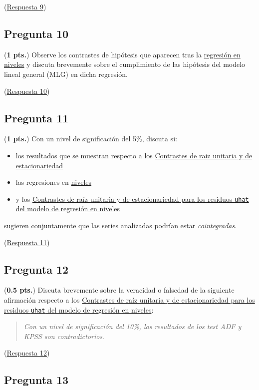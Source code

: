 \documentclass[10pt]{article}
\begin{document}
(\hyperref[sec:org66ff6be]{Respuesta 9})
\subsection*{Pregunta 10}
\label{sec:orge41fde9}

(\textbf{1 pts.}) Observe los contrastes de hipótesis que aparecen tras la \hyperref[sec:org1a45e1f]{regresión en niveles} y discuta brevemente sobre el cumplimiento de las hipótesis del modelo lineal general (MLG) en dicha regresión.

(\hyperref[sec:org0e46c64]{Respuesta 10})
\subsection*{Pregunta 11}
\label{sec:orgc7a6e69}

(\textbf{1 pts.}) Con un nivel de significación del 5\%, discuta si:
\begin{itemize}
\item los resultados que se muestran respecto a los \hyperref[sec:org3ac1b04]{Contrastes de raiz unitaria y de estacionariedad}
\item las regresiones en  \hyperref[sec:org1a45e1f]{niveles}
\item y los \hyperref[sec:org2512beb]{Contrastes de raíz unitaria y de estacionariedad para los residuos \texttt{uhat} del modelo de regresión en niveles}
\end{itemize}
sugieren conjuntamente que las series analizadas podrían estar \emph{cointegradas}.

(\hyperref[sec:org31c0c21]{Respuesta 11})
\subsection*{Pregunta 12}
\label{sec:orgb63c23f}

(\textbf{0.5 pts.}) Discuta brevemente sobre la veracidad o falsedad de la siguiente afirmación respecto a los \hyperref[sec:org2512beb]{Contrastes de raíz unitaria y de estacionariedad para los residuos \texttt{uhat} del modelo de regresión en niveles}:
\begin{quote}
\emph{Con un nivel de significación del 10\%, los resultados de los test ADF y KPSS son contradictorios}.
\end{quote}

(\hyperref[sec:org03606a8]{Respuesta 12})
\subsection*{Pregunta 13}
\label{sec:org138ff23}
\end{document}
